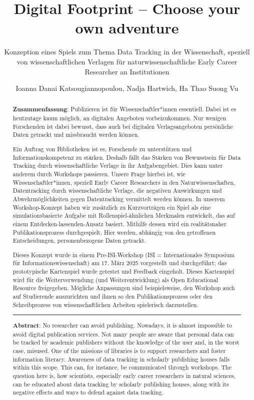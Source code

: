 \documentclass[a4paper,
fontsize=11pt,
oneside,
numbers=noperiodatend,
parskip=half-,
bibliography=totoc,
final
]{scrartcl}
\title{\LARGE{Digital Footprint – Choose your own adventure}}%
\subtitle{Konzeption eines Spiels zum Thema Data Tracking in der Wissenschaft, speziell von wissenschaftlichen Verlagen für naturwissenschaftliche Early Career Researcher an Institutionen}
\author{Ioanna Danai Katsougiannopoulou, Nadja Hartwich, Ha Thao Suong Vu} %
\date{}
\begin{document}
\maketitle
\thispagestyle{fancyplain} 

\begin{abstract}
\noindent
\textbf{Zusammenfassung}: Publizieren ist für Wissenschaftler*innen
essentiell. Dabei ist es heutzutage kaum möglich, an digitalen Angeboten
vorbeizukommen. Nur wenigen Forschenden ist dabei bewusst, dass auch bei
digitalen Verlagsangeboten persönliche Daten getrackt und missbraucht
werden können.

Ein Auftrag von Bibliotheken ist es, Forschende zu unterstützen und
Informationskompetenz zu stärken. Deshalb fällt das Stärken von
Bewusstsein für Data Tracking durch wissenschaftliche Verlage in ihr
Aufgabengebiet. Dies kann unter anderem durch Workshops passieren.
Unsere Frage hierbei ist, wie Wissenschaftler*innen, speziell Early
Career Researchers in den Naturwissenschaften, Datentracking durch
wissenschaftliche Verlage, die negativen Auswirkungen und
Abwehrmöglichkeiten gegen Datentracking vermittelt werden können. In
unserem Workshop-Konzept haben wir zusätzlich zu Kurzvorträgen ein Spiel
als eine simulationsbasierte Aufgabe mit Rollenspiel-ähnlichen Merkmalen
entwickelt, das auf einem Entdecken-lassenden-Ansatz basiert. Mithilfe
dessen wird ein realitätsnaher Publikationsprozess durchgespielt. Hier
werden, abhängig von den getroffenen Entscheidungen, personenbezogene
Daten getrackt.

Dieses Konzept wurde in einem Pre-ISI-Workshop (ISI = Internationales
Symposium für Informationswissenschaft) am 17. März 2025 vorgestellt und
durchgeführt; das prototypische Kartenspiel wurde getestet und Feedback
eingeholt. Dieses Kartenspiel wird für die Weiterverwendung (und
Weiterentwicklung) als Open Educational Resource freigegeben. Mögliche
Anpassungen sind beispielsweise, den Workshop auch auf Studierende
auszurichten und ihnen so den Publikationsprozess oder den
Schreibprozess von wissenschaftlichen Arbeiten spielerisch darzustellen.

\begin{center}\rule{0.5\linewidth}{0.5pt}\end{center}

\noindent
\textbf{Abstract}: No researcher can avoid publishing. Nowadays, it is
almost impossible to avoid digital publication services. Not many people
are aware that personal data can be tracked by academic publishers
without the knowledge of the user and, in the worst case, misused. One
of the missions of libraries is to support researchers and foster
information literacy. Awareness of data tracking in scholarly publishing
houses falls within this scope. This can, for instance, be communicated
through workshops. The question here is, how scientists, especially
early career researchers in natural sciences, can be educated about data
tracking by scholarly publishing houses, along with its negative effects
and ways to defend against data tracking.


\end{abstract}
\end{document}
